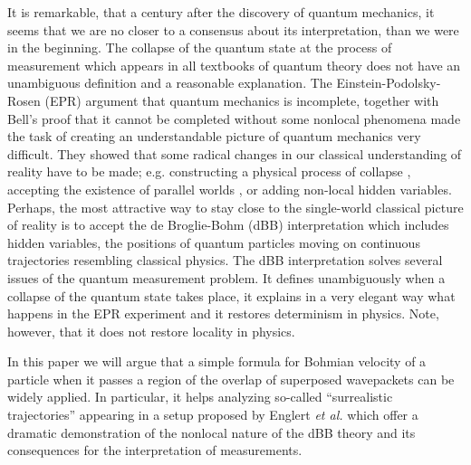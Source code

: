 \documentclass[12pt,preprint,tightenlines]{elsarticle}
\begin{document}
It is remarkable, that a century after the discovery of quantum mechanics,
it seems that we are no closer to a consensus about its interpretation,
than we were in the beginning. The collapse of the quantum state at
the process of measurement which appears in all textbooks of quantum
theory does not have an unambiguous definition and a reasonable explanation.
The Einstein-Podolsky-Rosen (EPR) argument \cite{PhysRev.47.777}
that quantum mechanics is incomplete, together with Bell's proof \cite{bell1964einstein}
that it cannot be completed without some nonlocal phenomena made the
task of creating an understandable picture of quantum mechanics very
difficult. They showed that some radical changes in our classical
understanding of reality have to be made; e.g. constructing a physical
process of collapse \cite{Pearle76,PhysRevD.34.470}, accepting the
existence of parallel worlds \cite{vaidman2002many}, or adding non-local
hidden variables. Perhaps, the most attractive way to stay close to
the single-world classical picture of reality is to accept the de
Broglie-Bohm (dBB) interpretation \cite{Broglie28,Bohm52}
which includes  hidden variables, the positions of quantum particles moving on continuous trajectories
resembling classical physics. The dBB interpretation solves several
issues of the quantum measurement problem. It defines unambiguously
when a collapse of the quantum state takes place, it explains
in a very elegant way what happens in the EPR experiment and it restores
determinism in physics. Note, however, that it does not restore locality
in physics.

In this paper we will argue that a simple formula for Bohmian velocity
of a particle when it passes a region of the overlap of superposed
wavepackets can be widely applied. In particular, it helps analyzing
so-called ``surrealistic trajectories'' appearing in a setup proposed
by Englert \textit{et al.} \cite{englert1992surrealistic} which offer
a dramatic demonstration of the nonlocal nature of the dBB theory
and its consequences for the interpretation of measurements.
\end{document}
